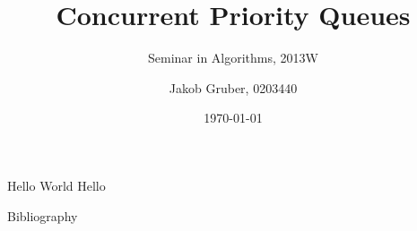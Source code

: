 \documentclass{beamer}
\title{Concurrent Priority Queues}
\subtitle{Seminar in Algorithms, 2013W}
\author{Jakob Gruber, 0203440}
\date{\today}
\begin{document}
\maketitle

\begin{frame}{Hello World}
Hello
\end{frame}

\begin{frame}[allowframebreaks]{Bibliography}
\nocite{*}
\printbibliography
\end{frame}
\end{document}
